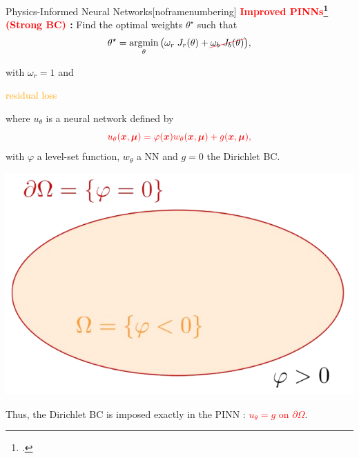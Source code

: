 \begin{appendixframe}{Physics-Informed Neural Networks}[noframenumbering]
	\textbf{\textcolor{red}{Improved PINNs\footcite{LagLikFot1998,FraMicNav2024} (Strong BC)} :} Find the optimal weights $\theta^\star$ such that
	\begin{equation*}
		\theta^\star = \argmin_{\theta}	\big( \omega_r \; J_r(\theta) + \Ccancel[red]{\omega_b \; J_b(\theta)} \big),%
	\end{equation*}
	
	\vspace{-5pt}
	with $\omega_r=1$ and
	\vspace{5pt}

	\begin{minipage}{0.2\linewidth}
		\flushright
		\textcolor{orange}{residual loss}
	\end{minipage}
	\begin{minipage}{0.68\linewidth}
		\centering
	\end{minipage}

	\vspace{15pt}
	\begin{minipage}{0.75\linewidth}
		where $u_\theta$ is a neural network defined by
		\begin{equation*}
			\textcolor{red}{u_{\theta}(\bm{x},\bm{\mu}) = \varphi(\bm{x}) w_{\theta}(\bm{x},\bm{\mu}) + g(\bm{x},\bm{\mu}),}
		\end{equation*}
		with $\varphi$ a level-set function, $w_\theta$ a NN and $g=0$ the Dirichlet BC. 
	\end{minipage}
	\begin{minipage}{0.23\linewidth}
		\vspace{-15pt}
		\hspace{-23pt}\includegraphics[width=1.3\linewidth]{images/intro/levelset.png}
	\end{minipage}

	\vspace{5pt}
	Thus, the Dirichlet BC is imposed exactly in the PINN : \textcolor{red}{$u_{\theta} = g$ on $\partial \Omega$}.

	\vspace{15pt}
\end{appendixframe}

